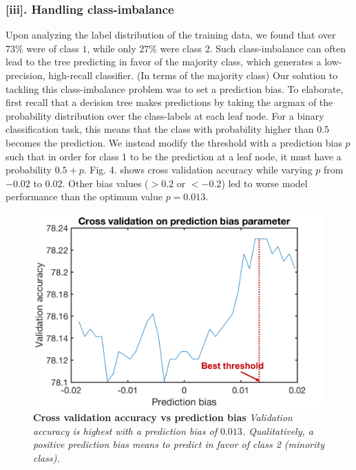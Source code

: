 \subsubsection*{[iii]. Handling class-imbalance}
Upon analyzing the label distribution of the training data, we found that over $73\%$ were of class $1$, while only $27\%$ were class 2. Such class-imbalance can often lead to the tree predicting in favor of the majority class, which generates a low-precision, high-recall classifier. (In terms of the majority class) Our solution to tackling this class-imbalance problem was to set a prediction bias. To elaborate, first recall that a decision tree makes predictions by taking the argmax of the probability distribution over the class-labels at each leaf node. For a binary classification task, this means that the class with probability higher than 0.5 becomes the prediction. We instead modify the threshold with a prediction bias $p$ such that in order for class 1 to be the prediction at a leaf node, it must have a probability $0.5 + p$. Fig. 4. shows cross validation accuracy while varying $p$ from $-0.02$ to $0.02$. Other bias values ($> 0.2$ or $< -0.2$) led to worse model performance than the optimum value $p = 0.013$.
\begin{figure}[h]
\center
\includegraphics[scale=0.5]{figure4/figure4.png}
\caption{\textbf{Cross validation accuracy vs prediction bias} \textit{Validation accuracy is highest with a prediction bias of $0.013$. Qualitatively, a positive prediction bias means to predict in favor of class 2 (minority class). }}
\end{figure}

